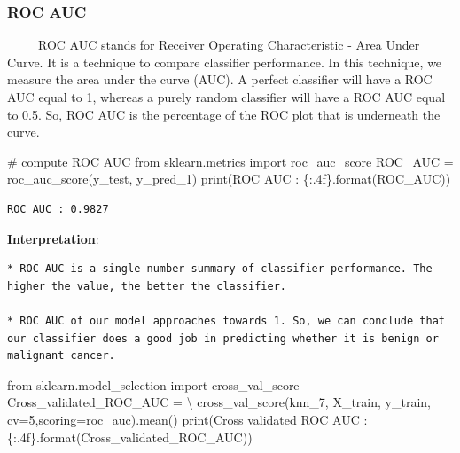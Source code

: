 \documentclass[
  letterpaper,
  DIV=11,
  numbers=noendperiod]{scrreprt}
\newenvironment{Shaded}{\begin{snugshade}}{\end{snugshade}}
\newcommand{\BuiltInTok}[1]{\textcolor[rgb]{0.00,0.23,0.31}{#1}}
\newcommand{\CommentTok}[1]{\textcolor[rgb]{0.37,0.37,0.37}{#1}}
\newcommand{\DecValTok}[1]{\textcolor[rgb]{0.68,0.00,0.00}{#1}}
\newcommand{\ImportTok}[1]{\textcolor[rgb]{0.00,0.46,0.62}{#1}}
\newcommand{\NormalTok}[1]{\textcolor[rgb]{0.00,0.23,0.31}{#1}}
\newcommand{\OperatorTok}[1]{\textcolor[rgb]{0.37,0.37,0.37}{#1}}
\newcommand{\SpecialCharTok}[1]{\textcolor[rgb]{0.37,0.37,0.37}{#1}}
\newcommand{\StringTok}[1]{\textcolor[rgb]{0.13,0.47,0.30}{#1}}
\begin{document}
\subsubsection{ROC AUC}\label{roc-auc}

~~~~~ROC AUC stands for Receiver Operating Characteristic - Area Under
Curve. It is a technique to compare classifier performance. In this
technique, we measure the area under the curve (AUC). A perfect
classifier will have a ROC AUC equal to 1, whereas a purely random
classifier will have a ROC AUC equal to 0.5. So, ROC AUC is the
percentage of the ROC plot that is underneath the curve.

\begin{Shaded}
\begin{Highlighting}[]
\CommentTok{\# compute ROC AUC}
\ImportTok{from}\NormalTok{ sklearn.metrics }\ImportTok{import}\NormalTok{ roc\_auc\_score}
\NormalTok{ROC\_AUC }\OperatorTok{=}\NormalTok{ roc\_auc\_score(y\_test, y\_pred\_1)}
\BuiltInTok{print}\NormalTok{(}\StringTok{\textquotesingle{}ROC AUC : }\SpecialCharTok{\{:.4f\}}\StringTok{\textquotesingle{}}\NormalTok{.}\BuiltInTok{format}\NormalTok{(ROC\_AUC))}
\end{Highlighting}
\end{Shaded}

\begin{verbatim}
ROC AUC : 0.9827
\end{verbatim}

\textbf{Interpretation}:

\begin{verbatim}
* ROC AUC is a single number summary of classifier performance. The higher the value, the better the classifier.

* ROC AUC of our model approaches towards 1. So, we can conclude that our classifier does a good job in predicting whether it is benign or malignant cancer.
\end{verbatim}

\begin{Shaded}
\begin{Highlighting}[]
\ImportTok{from}\NormalTok{ sklearn.model\_selection }\ImportTok{import}\NormalTok{ cross\_val\_score}
\NormalTok{Cross\_validated\_ROC\_AUC }\OperatorTok{=} \OperatorTok{\textbackslash{}}
\NormalTok{cross\_val\_score(knn\_7, X\_train, y\_train, cv}\OperatorTok{=}\DecValTok{5}\NormalTok{,scoring}\OperatorTok{=}\StringTok{\textquotesingle{}roc\_auc\textquotesingle{}}\NormalTok{).mean()}
\BuiltInTok{print}\NormalTok{(}\StringTok{\textquotesingle{}Cross validated ROC AUC : }\SpecialCharTok{\{:.4f\}}\StringTok{\textquotesingle{}}\NormalTok{.}\BuiltInTok{format}\NormalTok{(Cross\_validated\_ROC\_AUC))}
\end{Highlighting}
\end{Shaded}
\end{document}
